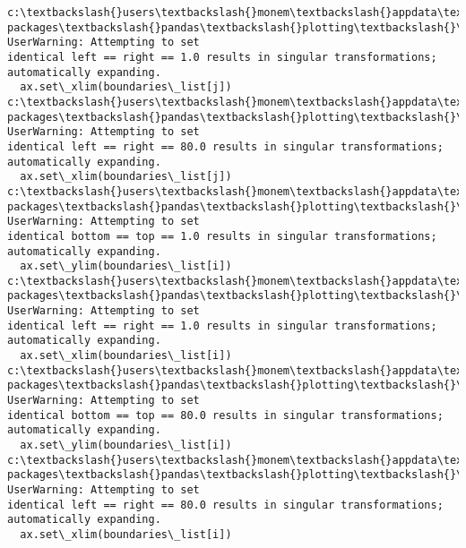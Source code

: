 \documentclass[11pt]{article}
\begin{document}
    \begin{Verbatim}[commandchars=\\\{\}]
c:\textbackslash{}users\textbackslash{}monem\textbackslash{}appdata\textbackslash{}local\textbackslash{}programs\textbackslash{}python\textbackslash{}python37\textbackslash{}lib\textbackslash{}site-
packages\textbackslash{}pandas\textbackslash{}plotting\textbackslash{}\_matplotlib\textbackslash{}misc.py:100: UserWarning: Attempting to set
identical left == right == 1.0 results in singular transformations;
automatically expanding.
  ax.set\_xlim(boundaries\_list[j])
c:\textbackslash{}users\textbackslash{}monem\textbackslash{}appdata\textbackslash{}local\textbackslash{}programs\textbackslash{}python\textbackslash{}python37\textbackslash{}lib\textbackslash{}site-
packages\textbackslash{}pandas\textbackslash{}plotting\textbackslash{}\_matplotlib\textbackslash{}misc.py:100: UserWarning: Attempting to set
identical left == right == 80.0 results in singular transformations;
automatically expanding.
  ax.set\_xlim(boundaries\_list[j])
c:\textbackslash{}users\textbackslash{}monem\textbackslash{}appdata\textbackslash{}local\textbackslash{}programs\textbackslash{}python\textbackslash{}python37\textbackslash{}lib\textbackslash{}site-
packages\textbackslash{}pandas\textbackslash{}plotting\textbackslash{}\_matplotlib\textbackslash{}misc.py:101: UserWarning: Attempting to set
identical bottom == top == 1.0 results in singular transformations;
automatically expanding.
  ax.set\_ylim(boundaries\_list[i])
c:\textbackslash{}users\textbackslash{}monem\textbackslash{}appdata\textbackslash{}local\textbackslash{}programs\textbackslash{}python\textbackslash{}python37\textbackslash{}lib\textbackslash{}site-
packages\textbackslash{}pandas\textbackslash{}plotting\textbackslash{}\_matplotlib\textbackslash{}misc.py:91: UserWarning: Attempting to set
identical left == right == 1.0 results in singular transformations;
automatically expanding.
  ax.set\_xlim(boundaries\_list[i])
c:\textbackslash{}users\textbackslash{}monem\textbackslash{}appdata\textbackslash{}local\textbackslash{}programs\textbackslash{}python\textbackslash{}python37\textbackslash{}lib\textbackslash{}site-
packages\textbackslash{}pandas\textbackslash{}plotting\textbackslash{}\_matplotlib\textbackslash{}misc.py:101: UserWarning: Attempting to set
identical bottom == top == 80.0 results in singular transformations;
automatically expanding.
  ax.set\_ylim(boundaries\_list[i])
c:\textbackslash{}users\textbackslash{}monem\textbackslash{}appdata\textbackslash{}local\textbackslash{}programs\textbackslash{}python\textbackslash{}python37\textbackslash{}lib\textbackslash{}site-
packages\textbackslash{}pandas\textbackslash{}plotting\textbackslash{}\_matplotlib\textbackslash{}misc.py:91: UserWarning: Attempting to set
identical left == right == 80.0 results in singular transformations;
automatically expanding.
  ax.set\_xlim(boundaries\_list[i])
    \end{Verbatim}
\end{document}
